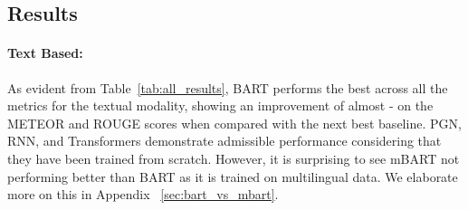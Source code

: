 \documentclass[11pt]{article}
\begin{document}
\subsection{Results}
\paragraph{Text Based:} As evident from Table~\ref{tab:all_results}, BART performs the best across all the metrics for the textual modality, showing an improvement of almost - on the METEOR and ROUGE scores when compared with the next best baseline. PGN, RNN, and Transformers demonstrate admissible performance considering that they have been trained from scratch. However, it is surprising to see mBART not performing better than BART as it is trained on multilingual data.  We elaborate more on this in Appendix ~\ref{sec:bart_vs_mbart}. 
\end{document}
